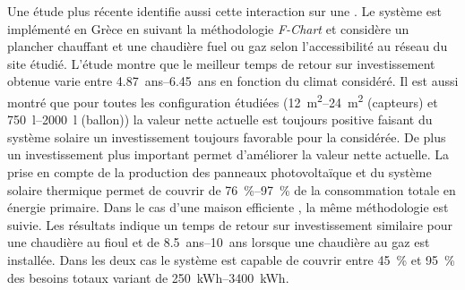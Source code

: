 Une étude plus récente \textcite{Tsalikis2015743} identifie aussi cette interaction
sur une . Le système est implémenté en Grèce en suivant
la méthodologie \textit{F-Chart} et considère un plancher chauffant et une chaudière
fuel ou gaz selon l’accessibilité au réseau du site étudié.
L’étude montre que le meilleur temps de retour sur investissement obtenue varie entre
\SIrange{4.87}{6.45}{ans} en fonction du climat considéré. Il est aussi montré que pour toutes les
configuration étudiées (\SIrange{12}{24}{\metre\squared} (capteurs) et \SIrange{750}{2000}{\litre} (ballon))
la valeur nette actuelle est toujours positive faisant du système solaire un investissement toujours favorable
pour la  considérée. De plus un investissement plus important
permet d’améliorer la valeur nette actuelle. La prise en compte de la production
des panneaux photovoltaïque et du système solaire thermique permet de couvrir de
\SIrange{76}{97}{\percent} de la consommation totale en énergie primaire.
Dans le cas d’une maison efficiente \parencite{Martinopoulos2014130}, la même méthodologie
est suivie. Les résultats indique un temps de retour sur investissement similaire pour
une chaudière au fioul et de \SIrange{8.5}{10}{ans} lorsque une chaudière au gaz
est installée.
Dans les deux cas le système est capable de couvrir entre \SI{45}{\percent} et \SI{95}{\percent}
des besoins totaux variant de \SIrange{250}{3400}{kWh}.




